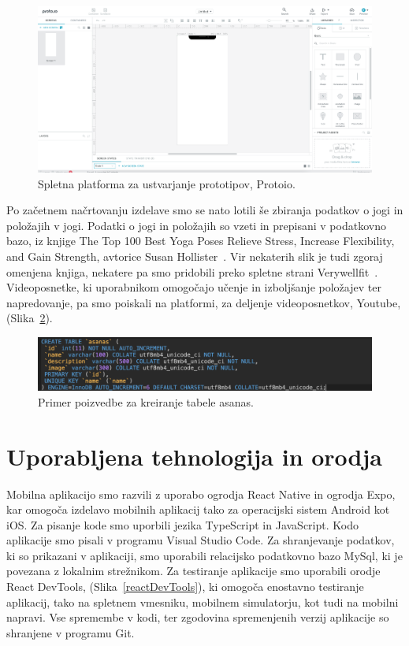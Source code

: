 \documentclass[a4paper, 12pt]{book}
\begin{document}
\begin{figure}[!htbp]
\begin{center}
\includegraphics[scale=.2]{protoio.jpg}
\end{center}
\caption{Spletna platforma za ustvarjanje prototipov, Protoio.}
\label{protoio}
\end{figure}

Po začetnem načrtovanju izdelave smo se nato lotili še zbiranja podatkov o jogi in položajih v jogi. Podatki o jogi in položajih so vzeti in prepisani v podatkovno bazo, iz knjige The Top 100 Best Yoga Poses Relieve Stress, Increase Flexibility, and Gain Strength, avtorice Susan Hollister~\cite{yoga}. Vir nekaterih slik je tudi zgoraj omenjena knjiga, nekatere pa smo pridobili preko spletne strani Verywellfit~\cite{verywellfit}. Videoposnetke, ki uporabnikom omogočajo učenje in izboljšanje položajev ter napredovanje, pa smo poiskali na platformi, za deljenje videoposnetkov, Youtube, (Slika~\ref{query}).

\begin{figure}[htbp]
\begin{center}
\includegraphics[scale=.55]{query.jpg}
\end{center}
\caption{Primer poizvedbe za kreiranje tabele asanas.}
\label{query}
\end{figure}

\chapter{Uporabljena tehnologija in orodja}
\label{ch2}
Mobilna aplikacijo smo razvili z uporabo ogrodja React Native in ogrodja Expo, kar omogoča izdelavo mobilnih aplikacij tako za operacijski sistem Android kot iOS. Za pisanje kode smo uporbili jezika TypeScript in JavaScript. Kodo aplikacije smo pisali v programu Visual Studio Code. Za shranjevanje podatkov, ki so prikazani v aplikaciji, smo uporabili relacijsko podatkovno bazo MySql, ki je povezana z lokalnim strežnikom. 
Za testiranje aplikacije smo uporabili orodje React DevTools, (Slika~\ref{reactDevTools}), ki omogoča enostavno testiranje aplikacij, tako na spletnem vmesniku, mobilnem simulatorju, kot tudi na mobilni napravi. Vse spremembe v kodi, ter zgodovina spremenjenih verzij aplikacije so shranjene v programu Git.
\end{document}
